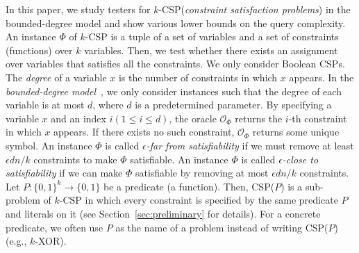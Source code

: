 \documentclass[letterpaper,11pt]{article}
\newcommand{\calo}{\mathcal{O}}
\newcommand{\bit}{\{0,1\}}
\newcommand{\kcsp}{\textsf{$k$-CSP}\xspace}
\newcommand{\csp}[1]{\textsf{CSP}(#1)\xspace}
\newcommand{\kxor}{$k$-\textsf{XOR}\xspace}
\begin{document}
In this paper, we study testers for \kcsp (\textit{constraint satisfaction problems}) in the bounded-degree model and show various lower bounds on the query complexity.
An instance $\Phi$ of \kcsp is a tuple of a set of variables and a set of constraints (functions) over $k$ variables.
Then, we test whether there exists an assignment over variables that satisfies all the constraints.
We only consider Boolean CSPs.
The \textit{degree} of a variable $x$ is the number of constraints in which $x$ appears.
In the \textit{bounded-degree model}~\cite{GR08},
we only consider instances such that the degree of each variable is at most $d$, where $d$ is a predetermined parameter.
By specifying a variable $x$ and an index $i(1\leq i \leq d)$, the oracle $\calo_\Phi$ returns the $i$-th constraint in which $x$ appears.
If there exists no such constraint, $\calo_\Phi$ returns some unique symbol.
An instance $\Phi$ is called \textit{$\epsilon$-far from satisfiability} if we must remove at least $\epsilon dn/k$ constraints to make $\Phi$ satisfiable.
An instance $\Phi$ is called \textit{$\epsilon$-close to satisfiability} if we can make $\Phi$ satisfiable by removing at most $\epsilon dn/k$ constraints.
Let $P:\bit^k\to \bit$ be a predicate (a function).
Then, \csp{$P$} is a sub-problem of \kcsp in which every constraint is specified by the same predicate $P$ and literals on it (see Section~\ref{sec:preliminary} for details).
For a concrete predicate, we often use $P$ as the name of a problem instead of writing \csp{$P$} (e.g., \kxor).
\end{document}
